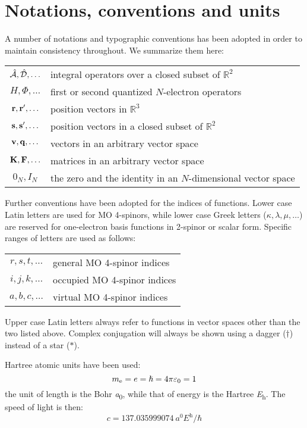 \chapter*{Notations, conventions and units}

A number of notations and typographic conventions has been adopted in
order to maintain consistency throughout. We summarize them here:
\begin{table*}[!h]
\begin{tabular}{c l}
 $\hat{\mathcal{A}}, \hat{\mathcal{D}}, \ldots$ & integral operators over a closed subset of $\mathbb{R}^2$ \\
 $H, \varPhi, \ldots$ & first or second quantized $N$-electron operators \\
 $\mathbf{r}, \mathbf{r}^\prime, \ldots$ & position vectors in $\mathbb{R}^3$ \\
 $\mathbf{s}, \mathbf{s}^\prime, \ldots$ & position vectors in a closed subset of $\mathbb{R}^2$ \\
 $\mathbf{v}, \mathbf{q}, \ldots$ & vectors in an arbitrary vector space \\
 $\mathbf{K}, \mathbf{F}, \ldots$ & matrices in an arbitrary vector space \\
 $0_N, I_N$ & the zero and the identity in an $N$-dimensional vector space
\end{tabular}
\end{table*}

Further conventions have been adopted for the indices of functions.
Lower case Latin letters are used for MO 4-spinors, while lower case
Greek letters ($\kappa, \lambda, \mu, \ldots$) are reserved for
one-electron basis functions in 2-spinor or scalar form.
Specific ranges of letters are used as follows:
\begin{table*}[!h]
\begin{tabular}{c l}
 $r, s, t, \ldots$ & general MO 4-spinor indices \\
 $i, j, k, \ldots$ & occupied MO 4-spinor indices \\
 $a, b, c, \ldots$ & virtual MO 4-spinor indices
\end{tabular}
\end{table*}

Upper case Latin letters always refer to functions in vector spaces
other than the two listed above. Complex conjugation will always be
shown using a dagger ($\dagger$) instead of a star ($*$).

Hartree atomic units have been used:~\autocite{Whiffen1978}
\begin{equation*}
 \si{\electronmass} = \si{\elementarycharge} = \hslash = 4\pi\diel_0 = 1
\end{equation*}
the unit of length is the Bohr \si{\bohr}, while that of energy is the Hartree \si{\hartree}.
The speed of light is then:
\begin{equation*}
 c = \SI{137.035999074}{\bohr\hartree\per\planckbar}
\end{equation*}

